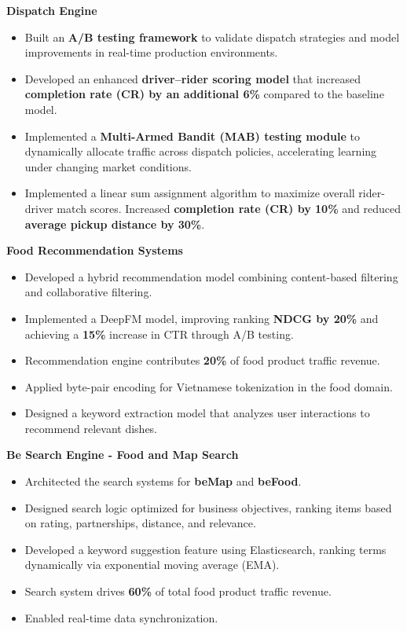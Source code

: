\documentclass[10pt, letterpaper]{article}
\newenvironment{zitemize}{
\begin{itemize} \itemsep 0pt \parskip 0pt \parsep 1pt}
{\end{itemize}\vspace{-.5em}}
\begin{document}
\textbf{\small{Dispatch Engine}}
\begin{zitemize}
    \item \small{Built an \textbf{A/B testing framework} to validate dispatch strategies and model improvements in real-time production environments.}
    \item \small{Developed an enhanced \textbf{driver–rider scoring model} that increased \textbf{completion rate (CR) by an additional 6\%} compared to the baseline model.}
    \item \small{Implemented a \textbf{Multi-Armed Bandit (MAB) testing module} to dynamically allocate traffic across dispatch policies, accelerating learning under changing market conditions.}

    \item \small{Implemented a linear sum assignment algorithm to maximize overall rider-driver match scores. Increased \textbf{completion rate (CR) by 10\%} and reduced \textbf{average pickup distance by 30\%}.}
\end{zitemize}

\textbf{\small{Food Recommendation Systems}}
\begin{zitemize}
    \vspace{-1mm}\item \small{Developed a hybrid recommendation model combining content-based filtering and collaborative filtering.}
    \item \small{Implemented a DeepFM model, improving ranking \textbf{NDCG by 20\%} and achieving a \textbf{15\%} increase in CTR through A/B testing.}
    \item \small{Recommendation engine contributes \textbf{20\%} of food product traffic revenue.}
    \item \small{Applied byte-pair encoding for Vietnamese tokenization in the food domain.}
    \item \small{Designed a keyword extraction model that analyzes user interactions to recommend relevant dishes.}
\end{zitemize}

\textbf{\small{Be Search Engine - Food and Map Search}}
\begin{zitemize}
    \vspace{-1mm}\item \small{Architected the search systems for \textbf{beMap} and \textbf{beFood}.}
    \item \small{Designed search logic optimized for business objectives, ranking items based on rating, partnerships, distance, and relevance.}
    \item \small{Developed a keyword suggestion feature using Elasticsearch, ranking terms dynamically via exponential moving average (EMA).}
    \item \small{Search system drives \textbf{60\%} of total food product traffic revenue.}
    \item \small{Enabled real-time data synchronization.}
\end{zitemize}
\end{document}
